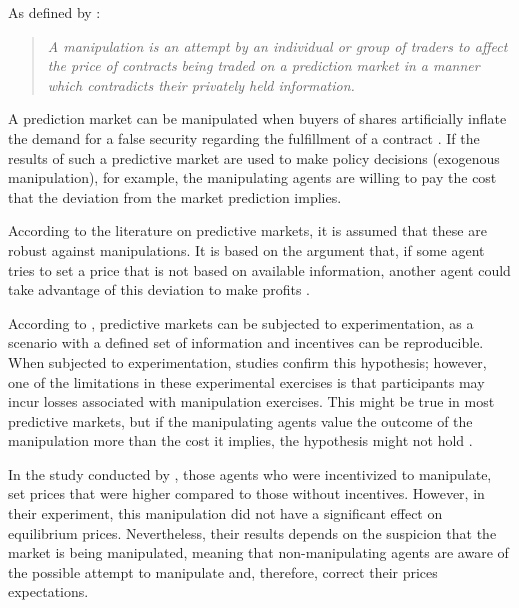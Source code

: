 As defined by \cite{buckley2017effect}:
\begin{quote}
    \textit{A manipulation is an attempt by an individual or group of traders to affect the price of contracts being traded on a prediction market in a manner which contradicts their privately held information.}
\end{quote}
    
A prediction market can be manipulated when buyers of shares artificially inflate the demand for a false security regarding the fulfillment of a contract \parencite{choo2022manipulation}. If the results of such a predictive market are used to make policy decisions (exogenous manipulation), for example, the manipulating agents are willing to pay the cost that the deviation from the market prediction implies.
    
According to the literature on predictive markets, it is assumed that these are robust against manipulations. It is based on the argument that, if some agent tries to set a price that is not based on available information, another agent could take advantage of this deviation to make profits \parencite{buckley2017effect}.
    
According to \cite{HANSON2006449}, predictive markets can be subjected to experimentation, as a scenario with a defined set of information and incentives can be reproducible. When subjected to experimentation, studies confirm this hypothesis; however, one of the limitations in these experimental exercises is that participants may incur losses associated with manipulation exercises. This might be true in most predictive markets, but if the manipulating agents value the outcome of the manipulation more than the cost it implies, the hypothesis might not hold \parencite{deck2013affecting}.

In the study conducted by \citeauthor{HANSON2006449}, those agents who were incentivized to manipulate, set prices that were higher compared to those without incentives. However, in their experiment, this manipulation did not have a significant effect on equilibrium prices. Nevertheless, their results depends on the suspicion that the market is being manipulated, meaning that non-manipulating agents are aware of the possible attempt to manipulate and, therefore, correct their prices expectations.
    
